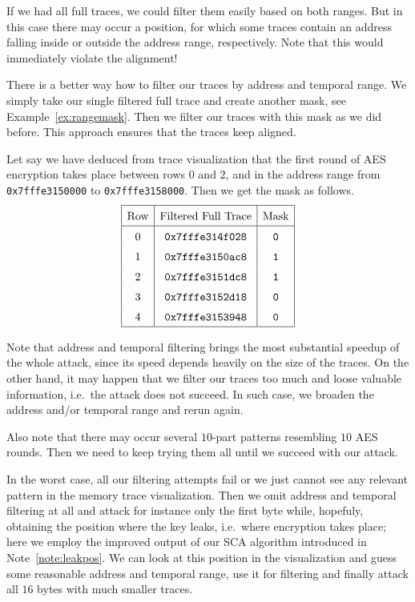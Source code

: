 		If we had all full traces, we could filter them easily based on both ranges. But in this case there may occur a position, for which some traces contain an address falling inside or outside the address range, respectively. Note that this would immediately violate the alignment!
		
		\begin{remark}
		\label{rem:rangemask}
			There is a better way how to filter our traces by address and temporal range. We simply take our single filtered full trace and create another mask, see Example~\ref{ex:rangemask}. Then we filter our traces with this mask as we did before. This approach ensures that the traces keep aligned.
		\end{remark}
		
		\begin{example}
		\label{ex:rangemask}
			Let say we have deduced from trace visualization that the first round of AES encryption takes place between rows $0$ and $2$, and in the address range from {\tt 0x7fffe3150000} to {\tt 0x7fffe3158000}. Then we get the mask as follows.
			\[
			\arraycolsep=.5em\def\arraystretch{1.5}
				\begin{array}{|c|c|c|}
					\hline
					\textnormal{Row} & \textnormal{Filtered Full Trace} & \textnormal{Mask} \\
					\hline
					0 & {\tt 0x7fffe314f028} & {\tt 0} \\
					1 & {\tt 0x7fffe3150ac8} & {\tt 1} \\
					2 & {\tt 0x7fffe3151dc8} & {\tt 1} \\
					3 & {\tt 0x7fffe3152d18} & {\tt 0} \\
					4 & {\tt 0x7fffe3153948} & {\tt 0} \\
					\hline
				\end{array}
			\]
		\end{example}
		
		Note that address and temporal filtering brings the most substantial speedup of the whole attack, since its speed depends heavily on the size of the traces. On the other hand, it may happen that we filter our traces too much and loose valuable information, i.e.\ the attack does not succeed. In such case, we broaden the address and/or temporal range and rerun again.
		
		Also note that there may occur several $10$-part patterns resembling $10$ AES rounds. Then we need to keep trying them all until we succeed with our attack.
		
		In the worst case, all our filtering attempts fail or we just cannot see any relevant pattern in the memory trace visualization. Then we omit address and temporal filtering at all and attack for instance only the first byte while, hopefuly, obtaining the position where the key leaks, i.e.\ where encryption takes place; here we employ the improved output of our SCA algorithm introduced in Note~\ref{note:leakpos}. We can look at this position in the visualization and guess some reasonable address and temporal range, use it for filtering and finally attack all $16$ bytes with much smaller traces.


